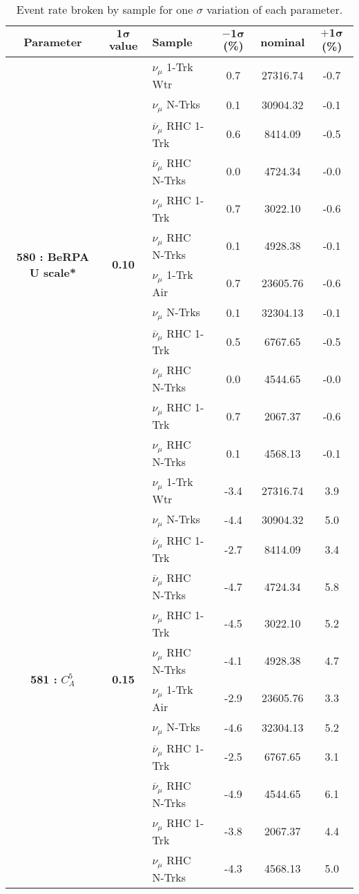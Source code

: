 \addtocounter{table}{-1}
\begin{table}[ht!]
\centering
\begin{tabular}{ c  c  l  c  c  c }
\midrule[1.3pt]
\textbf{Parameter} & \textbf{$\mathbf{1\sigma}$ value} & \textbf{Sample} & \textbf{$\mathbf{-1\sigma}$ (\%)}  &  \textbf{nominal}  &  \textbf{$\mathbf{+1\sigma}$ (\%)} \\
\midrule[1.3pt]
\multirow{12}{*}{\textbf{580 : BeRPA U scale*}} & \multirow{12}{*}{\textbf{0.10}} & $\nu_\mu$ 1-Trk Wtr &   0.7 &  27316.74 &   -0.7 \\ 
 &  & $\nu_\mu$ N-Trks &   0.1 &  30904.32 &   -0.1 \\ 
 &  & $\overline{\nu}_\mu$ RHC 1-Trk &   0.6 &  8414.09 &   -0.5 \\ 
 &  & $\overline{\nu}_\mu$ RHC N-Trks &   0.0 &  4724.34 &   -0.0 \\ 
 &  & $\nu_\mu$ RHC 1-Trk &   0.7 &  3022.10 &   -0.6 \\ 
 &  & $\nu_\mu$ RHC N-Trks &   0.1 &  4928.38 &   -0.1 \\ 
 &  & $\nu_\mu$ 1-Trk Air &   0.7 &  23605.76 &   -0.6 \\ 
 &  & $\nu_\mu$ N-Trks &   0.1 &  32304.13 &   -0.1 \\ 
 &  & $\overline{\nu}_\mu$ RHC 1-Trk &   0.5 &  6767.65 &   -0.5 \\ 
 &  & $\overline{\nu}_\mu$ RHC N-Trks &   0.0 &  4544.65 &   -0.0 \\ 
 &  & $\nu_\mu$ RHC 1-Trk &   0.7 &  2067.37 &   -0.6 \\ 
 &  & $\nu_\mu$ RHC N-Trks &   0.1 &  4568.13 &   -0.1 \\ 
\midrule[1.3pt]
\multirow{12}{*}{\textbf{581 : }$C_A^5$} & \multirow{12}{*}{\textbf{0.15}} & $\nu_\mu$ 1-Trk Wtr &   -3.4 &  27316.74 &   3.9 \\ 
 &  & $\nu_\mu$ N-Trks &   -4.4 &  30904.32 &   5.0 \\ 
 &  & $\overline{\nu}_\mu$ RHC 1-Trk &   -2.7 &  8414.09 &   3.4 \\ 
 &  & $\overline{\nu}_\mu$ RHC N-Trks &   -4.7 &  4724.34 &   5.8 \\ 
 &  & $\nu_\mu$ RHC 1-Trk &   -4.5 &  3022.10 &   5.2 \\ 
 &  & $\nu_\mu$ RHC N-Trks &   -4.1 &  4928.38 &   4.7 \\ 
 &  & $\nu_\mu$ 1-Trk Air &   -2.9 &  23605.76 &   3.3 \\ 
 &  & $\nu_\mu$ N-Trks &   -4.6 &  32304.13 &   5.2 \\ 
 &  & $\overline{\nu}_\mu$ RHC 1-Trk &   -2.5 &  6767.65 &   3.1 \\ 
 &  & $\overline{\nu}_\mu$ RHC N-Trks &   -4.9 &  4544.65 &   6.1 \\ 
 &  & $\nu_\mu$ RHC 1-Trk &   -3.8 &  2067.37 &   4.4 \\ 
 &  & $\nu_\mu$ RHC N-Trks &   -4.3 &  4568.13 &   5.0 \\ 
\midrule[1.3pt]
\end{tabular}
\centering
\caption{Event rate broken by sample for one $\sigma$ variation of each parameter.}
\end{table}
\addtocounter{table}{-1}



